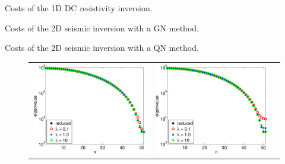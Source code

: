 \documentclass{iopart}
\begin{document}
\begin{table}
\centering

\caption{Costs of the 1D DC resistivity inversion.}
\label{table:1D_exp1}
\end{table}

\begin{table}
\centering

\caption{Costs of the 2D seismic inversion with a GN method.}
\label{table:2D_exp1}
\end{table}

\begin{table}
\centering

\caption{Costs of the 2D seismic inversion with a QN method.}
\label{table:2D_exp2}
\end{table}
\clearpage

\begin{figure}
\centering
\begin{tabular}{ccc}
\includegraphics[scale=.2]{./figs/example2_a}&
\includegraphics[scale=.2]{./figs/example2_b}&

\end{tabular}
\end{figure}
\end{document}

